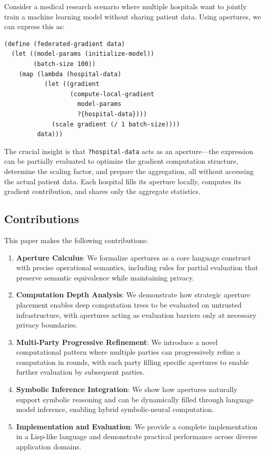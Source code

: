 \documentclass[12pt]{article}
\begin{document}
Consider a medical research scenario where multiple hospitals want to jointly train a machine learning model without sharing patient data. Using apertures, we can express this as:

\begin{lstlisting}
(define (federated-gradient data)
  (let ((model-params (initialize-model))
        (batch-size 100))
    (map (lambda (hospital-data)
           (let ((gradient 
                  (compute-local-gradient 
                    model-params 
                    ?{hospital-data})))
             (scale gradient (/ 1 batch-size))))
         data)))
\end{lstlisting}

The crucial insight is that \texttt{?hospital-data} acts as an aperture—the expression can be partially evaluated to optimize the gradient computation structure, determine the scaling factor, and prepare the aggregation, all without accessing the actual patient data. Each hospital fills its aperture locally, computes its gradient contribution, and shares only the aggregate statistics.

\subsection{Contributions}

This paper makes the following contributions:

\begin{enumerate}
    \item \textbf{Aperture Calculus}: We formalize apertures as a core language construct with precise operational semantics, including rules for partial evaluation that preserve semantic equivalence while maintaining privacy.
    
    \item \textbf{Computation Depth Analysis}: We demonstrate how strategic aperture placement enables deep computation trees to be evaluated on untrusted infrastructure, with apertures acting as evaluation barriers only at necessary privacy boundaries.
    
    \item \textbf{Multi-Party Progressive Refinement}: We introduce a novel computational pattern where multiple parties can progressively refine a computation in rounds, with each party filling specific apertures to enable further evaluation by subsequent parties.
    
    \item \textbf{Symbolic Inference Integration}: We show how apertures naturally support symbolic reasoning and can be dynamically filled through language model inference, enabling hybrid symbolic-neural computation.
    
    \item \textbf{Implementation and Evaluation}: We provide a complete implementation in a Lisp-like language and demonstrate practical performance across diverse application domains.
\end{enumerate}
\end{document}
